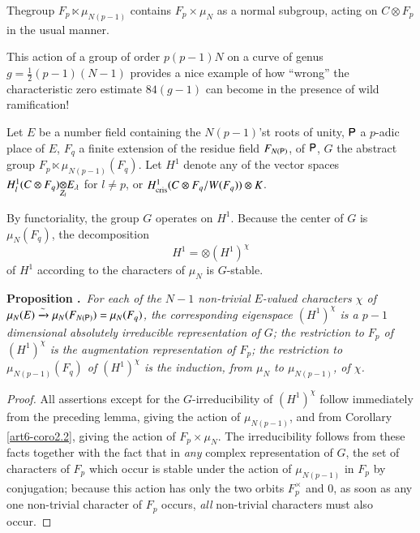 The\pageoriginale group $F_{p}\ltimes \mu_{N(p-1)}$ contains $F_{p}\times \mu_{N}$ as a normal subgroup, acting on $C\otimes F_{p}$ in the usual manner.

\begin{remark*}
This action of a group of order $p(p-1)N$ on a curve of genus $g=\frac{1}{2}(p-1)(N-1)$ provides a nice example of how ``wrong'' the characteristic zero estimate $84(g-1)$ can become in the presence of wild ramification!
\end{remark*}

Let $E$ be a number field containing the $N(p-1)$'st roots of unity, $\mathsf{P}$ a $p$-adic place of $E$, $F_{q}$ a finite extension of the residue field $F_{N(\mathsf{P})}$, of $\mathsf{P}$, $G$ the abstract group $F_{p}\ltimes \mu_{N(p-1)}(F_{q})$. Let $H^{1}$ denote any of the vector spaces $\foprod{H^{1}_{l}(C\otimes F_{q})}{E_{\lambda}}{Z_{l}}$ for $l\neq p$, or $H^{1}_{\operatorname{cris}}(C\otimes F_{q}/W(F_{q}))\otimes K$. 

By functoriality, the group $G$ operates on $H^{1}$. Because the center of $G$ is $\mu_{N}(F_{q})$, the decomposition
$$
H^{1}=\otimes (H^{1})^{\chi}
$$
of $H^{1}$ according to the characters of $\mu_{N}$ is $G$-stable.

\medskip
\noindent
{\bf Proposition .\label{art6-prop7.2}}~{\em For each of the $N-1$ non-trivial $E$-valued characters $\chi$ of $\mu_{N}(E)\xrightarrow{\sim}\mu_{N}(F_{N(\mathsf{P})})=\mu_{N}(F_{q})$, the corresponding eigenspace $(H^{1})^{\chi}$ is a $p-1$ dimensional absolutely irreducible representation of $G$; the restriction to $F_{p}$ of $(H^{1})^{\chi}$ is the augmentation representation of $F_{p}$; the restriction to $\mu_{N(p-1)}(F_{q})$ of $(H^{1})^{\chi}$ is the induction, from $\mu_{N}$ to $\mu_{N(p-1)}$, of $\chi$.}

\begin{proof}
All assertions except for the $G$-irreducibility of $(H^{1})^{\chi}$ follow immediately from the preceding lemma, giving the action of $\mu_{N(p-1)}$, and from Corollary \eqref{art6-coro2.2}, giving the action of $F_{p}\times \mu_{N}$. The irreducibility follows from these facts together with the fact that in {\em any} complex representation of $G$, the set of characters of $F_{p}$ which occur is stable under the action of $\mu_{N(p-1)}$ in $F_{p}$ by conjugation; because this action has only the two orbits $F^{\times}_{p}$ and $0$, as soon as any one non-trivial character of $F_{p}$ occurs, {\em all} non-trivial characters must also occur.
\end{proof}

